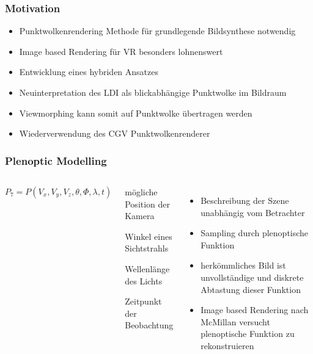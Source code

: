\documentclass[aspectratio=169]{beamer}
\begin{document}
\begin{frame}
    \frametitle{Motivation}
    \begin{itemize}
        \item Punktwolkenrendering Methode für grundlegende Bildsynthese notwendig
        \item Image based Rendering für VR besonders lohnenswert
        \item Entwicklung eines hybriden Ansatzes
        \item Neuinterpretation des LDI als blickabhängige Punktwolke im Bildraum
        \item Viewmorphing kann somit auf Punktwolke übertragen werden
        \item Wiederverwendung des CGV Punktwolkenrenderer
    \end{itemize}
\end{frame}

\begin{frame}
    \frametitle{Plenoptic Modelling}

    \begin{columns}
        \begin{equation}
            P_7 = P(V_x, V_y, V_z, \theta, \Phi, \lambda, t)
        \end{equation}
        
        \vspace{.5cm}

        \begin{description}[style=sameline]
            \item[\( V_x, V_y, V_z \)] mögliche Position der Kamera
            \item[\( \theta, \Phi \)] Winkel eines Sichtstrahls
            \item[\( \lambda \)] Wellenlänge des Lichts
            \item[\( t \)] Zeitpunkt der Beobachtung
        \end{description}
        \begin{itemize}
            \item Beschreibung der Szene unabhängig vom Betrachter
            \item Sampling durch plenoptische Funktion
            \item herkömmliches Bild ist unvollständige und diskrete Abtastung dieser Funktion
            \item Image based Rendering nach McMillan versucht plenoptische Funktion zu rekonstruieren
        \end{itemize}
    \end{columns}
\end{frame}
\end{document}
